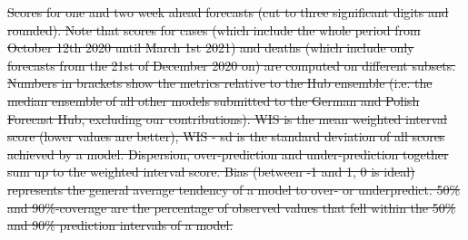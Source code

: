 \documentclass[10pt,letterpaper]{article}
\providecommand{\DIFdeltex}[1]{{\protect\color{red}\sout{#1}}}                      %
\providecommand{\DIFdelFL}[1]{\DIFdel{#1}} %
\providecommand{\DIFdel}[1]{\texorpdfstring{\DIFdeltex{#1}}{}} %
\begin{document}
{%
\DIFdelFL{Scores for one and two week ahead forecasts (cut to three significant digits and rounded). Note that scores for cases (which include the whole period from October 12th 2020 until March 1st 2021) and deaths (which include only forecasts from the 21st of December 2020 on) are computed on different subsets. Numbers in brackets show the metrics relative to the Hub ensemble (i.e. the median ensemble of all other models submitted to the German and Polish Forecast Hub, excluding our contributions). WIS is the mean weighted interval score (lower values are better), WIS - sd is the standard deviation of all scores achieved by a model. Dispersion, over-prediction and under-prediction together sum up to the weighted interval score. Bias (between -1 and 1, 0 is ideal) represents the general average tendency of a model to over- or underpredict. 50\% and 90\%-coverage are the percentage of observed values that fell within the 50\% and 90\% prediction intervals of a model.}%
\DIFdelFL{\hspace{\textwidth}}}
\end{document}
